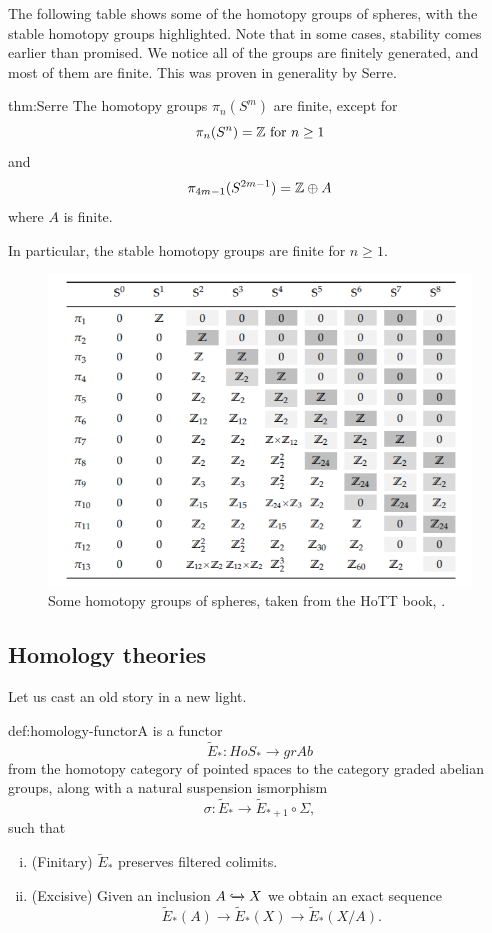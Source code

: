 The following table shows some of the homotopy groups of spheres, with the stable homotopy groups highlighted. Note that in some cases, stability comes earlier than promised. We notice all of the groups are finitely generated, and most of them are finite. This was proven in generality by Serre.
\begin{theorem}[Serre]{thm:Serre}
    The homotopy groups $\pi_n(S^m)$  are finite, except for
    $$\pi_n(S^n)=\mathbb{Z} \text{ for } n\geq 1$$
    and $$\pi_{4m-1}(S^{2m-1})=\mathbb{Z}\oplus A$$
    where $A$ is finite.
\end{theorem}

In particular, the stable homotopy groups are finite for $n\geq 1.$
\begin{figure}[h!]
\includegraphics[width=14cm]{Content/stable.png}
\centering
\caption{Some homotopy groups of spheres, taken from the HoTT book, \cite{HoTT}.}
\end{figure}

\subsection{Homology theories}
Let us cast an old story in a new light. 
\begin{definition}{def:homology-functor}A  is a functor
$$\tilde{E}_*:HoS_*\rightarrow grAb$$
from the homotopy category of pointed spaces to the category graded abelian groups, along with a natural suspension ismorphism $$\sigma:\tilde{E}_*\rightarrow \tilde{E}_{*+1}\circ \Sigma,$$ such that
\begin{enumerate}[(i)]
\item (Finitary) $\tilde{E}_*$ preserves filtered colimits.
\item (Excisive) Given an inclusion $A\xhookrightarrow{} X$ we obtain an exact sequence $$\tilde{E}_*(A)\rightarrow \tilde{E}_*(X)\rightarrow \tilde{E}_*(X/A).$$
\end{enumerate}
\end{definition}

